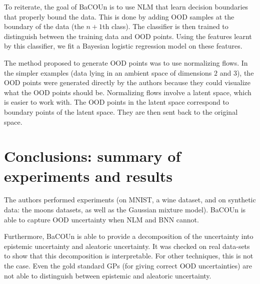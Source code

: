 \documentclass{article}
\theoremstyle{definition}
\theoremstyle{definition}
\theoremstyle{remark}
\begin{document}
To reiterate, the goal of BaCOUn is to use NLM that learn decision boundaries that properly bound the data. This is done by adding OOD samples at the boundary of the data (the $n+1$th class). The classifier is then trained to distinguish between the training data and OOD points. Using the features learnt by this classifier, we fit a Bayesian logistic regression model on these features. 

The method proposed to generate OOD points was to use normalizing flows. In the simpler examples (data lying in an ambient space of dimensions $2$ and $3$), the OOD points were generated directly by the authors because they could visualize what the OOD points should be. Normalizing flows involve a latent space, which is easier to work with. The OOD points in the latent space correspond to boundary points of the latent space. They are then sent back  to the original space.

\section{Conclusions: summary of experiments and results}

The authors performed experiments (on MNIST, a wine dataset, and on synthetic data: the moons datasets, as well as the Gaussian mixture model). BaCOUn is able to capture OOD uncertainty when NLM and BNN cannot. 

Furthermore, BaCOUn is able to provide a decomposition of the uncertainty into epistemic uncertainty and aleatoric uncertainty. It was checked on real data-sets to show that this decomposition is interpretable. For other techniques, this is not the case. Even the gold standard GPs (for giving correct OOD uncertainties) are not able to distinguish between epistemic and aleatoric uncertainty.
\end{document}
